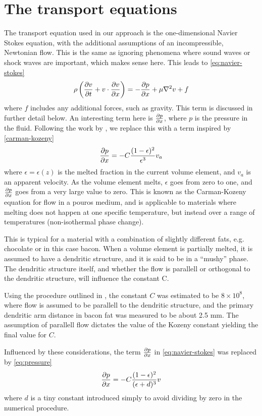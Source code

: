 \section{The transport equations}
The transport equation used in our approach is the one-dimensional Navier Stokes
equation, with the additional assumptions of an incompressible, Newtonian flow.
This is the same as ignoring phenomena where sound waves or shock waves are
important, which makes sense here. This leads to \cref{eq:navier-stokes}
\begin{equation}
  \rho \left(\frac{\partial v}{\partial t} + v \cdot \frac{\partial v}{\partial x}\right) = -\frac{\partial p}{\partial x} + \mu \nabla^2 v + f
 \label{eq:navier-stokes}
\end{equation}
where $f$ includes any additional forces, such as gravity. This term is
discussed in further detail below. An interesting term here is $\frac{\partial p}{\partial x}$, where
$p$ is the pressure in the fluid. Following the work by \cite{brent}, we replace
this with a term inspired by \cref{carman-kozeny}
\begin{equation}
  \frac{\partial p}{\partial x} = -C\frac{ (1-\epsilon)^2}{\epsilon^3} v_a
  \label{carman-kozeny}
\end{equation}
where $\epsilon = \epsilon(z)$ is the melted fraction in the current volume element, and
$v_a$ is an apparent velocity. As the volume element melts, $\epsilon$ goes from
zero to one, and $\frac{\partial p}{\partial x}$ goes from a very large value to zero. This is known 
as the Carman-Kozeny equation for flow in a pouros medium, and is applicable to 
materials where melting does not happen at one specific temperature, but instead 
over a range of temperatures (non-isothermal phase change). \cite{poirier} 

This is typical for a material with a combination of slightly different
fats, e.g. chocolate or in this case bacon. When a volume element is partially
melted, it is assumed to have a dendritic structure, and it is said to be in a
``mushy'' phase. The dendritic structure itself, and whether the flow is parallell or
orthogonal to the dendritic structure, will influence the constant C. 

Using the procedure outlined in \cite{poirier}, the constant $C$ was estimated to be
$8 \times 10^8$, where flow is assumed to be parallell to the dendritic
structure, and the primary dendritic arm distance in bacon fat was measured to be
about 2.5 mm. The assumption of parallell flow dictates the value of the Kozeny
constant yielding the final value for $C$.

Influenced by these considerations, the term $\frac{\partial p}{\partial x}$ in
\cref{eq:navier-stokes} was replaced by \cref{eq:pressure}
\begin{equation}
  \frac{\partial p}{\partial x} =  -C\frac{ (1-\epsilon)^2}{(\epsilon+d)^3} v
  \label{eq:pressure}
\end{equation}
where $d$ is a tiny constant introduced simply to avoid dividing by zero in the
numerical procedure.

